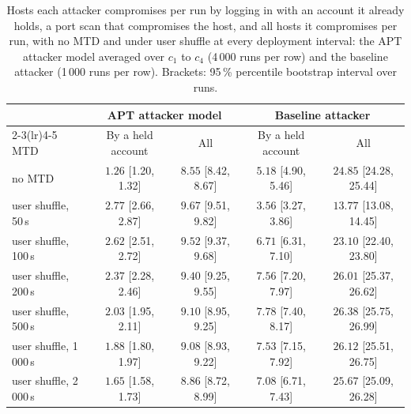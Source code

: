 
\begin{table}[htbp]
\centering
\caption[Hosts compromised by a held account, with no MTD and under user shuffle]{Hosts each attacker compromises per run by logging in with an account it already holds, a port scan that compromises the host, and all hosts it compromises per run, with no MTD and under user shuffle at every deployment interval: the APT attacker model averaged over $c_1$ to $c_4$ (4\,000 runs per row) and the baseline attacker (1\,000 runs per row). Brackets: 95\,\% percentile bootstrap interval over runs.}
\label{tab:fa-accounts}
\tablestyle
\begin{tabular}{@{}l *{4}{c}@{}}
\toprule
& \multicolumn{2}{c}{APT attacker model} & \multicolumn{2}{c}{Baseline attacker} \\
\cmidrule(lr){2-3}\cmidrule(lr){4-5}
MTD & By a held account & All & By a held account & All \\
\midrule
no MTD & $1.26$ [1.20, 1.32] & $8.55$ [8.42, 8.67] & $5.18$ [4.90, 5.46] & $24.85$ [24.28, 25.44] \\
\midrule
user shuffle, 50\,s & $2.77$ [2.66, 2.87] & $9.67$ [9.51, 9.82] & $3.56$ [3.27, 3.86] & $13.77$ [13.08, 14.45] \\
user shuffle, 100\,s & $2.62$ [2.51, 2.72] & $9.52$ [9.37, 9.68] & $6.71$ [6.31, 7.10] & $23.10$ [22.40, 23.80] \\
user shuffle, 200\,s & $2.37$ [2.28, 2.46] & $9.40$ [9.25, 9.55] & $7.56$ [7.20, 7.97] & $26.01$ [25.37, 26.62] \\
user shuffle, 500\,s & $2.03$ [1.95, 2.11] & $9.10$ [8.95, 9.25] & $7.78$ [7.40, 8.17] & $26.38$ [25.75, 26.99] \\
user shuffle, 1\,000\,s & $1.88$ [1.80, 1.97] & $9.08$ [8.93, 9.22] & $7.53$ [7.15, 7.92] & $26.12$ [25.51, 26.75] \\
user shuffle, 2\,000\,s & $1.65$ [1.58, 1.73] & $8.86$ [8.72, 8.99] & $7.08$ [6.71, 7.43] & $25.67$ [25.09, 26.28] \\
\bottomrule
\end{tabular}
\end{table}
